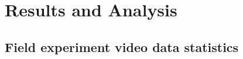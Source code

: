 \documentclass[12pt,twoside]{article}
\begin{document}

\section{Results and Analysis}
\label{sec:results}
\subsection{Field experiment video data statistics}
\label{sec:statistics}
\end{document}
